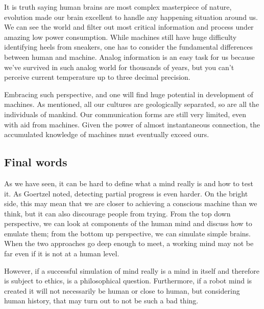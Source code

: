 \documentclass[11pt]{article}
\begin{document}
It is truth saying human brains are most complex masterpiece of nature, evolution made our brain excellent to handle any happening situation around us. We can see the world and filter out most critical information and process under amazing low power consumption. While machines still have huge difficulty identifying heels from sneakers, one has to consider the fundamental differences between human and machine. Analog information is an easy task for us because we've survived in such analog world for thousands of years, but you can't perceive current temperature up to three decimal precision.

Embracing such perspective, and one will find huge potential in development of machines. As mentioned, all our cultures are geologically separated, so are all the individuals of mankind. Our communication forms are still very limited, even with aid from machines. Given the power of almost instantaneous connection, the accumulated knowledge of machines must eventually exceed ours.

\subsection{Final words}
As we have seen, it can be hard to define what a mind really is and how to test it. 
As Goertzel noted, detecting partial progress is even harder. 
On the bright side, this may mean that we are closer to achieving a conscious machine than we think, but it can also discourage people from trying. 
From the top down perspective, we can look at components of the human mind and discuss how to emulate them; from the bottom up perspective, we can simulate simple brains. 
When the two approaches go deep enough to meet, a working mind may not be far even if it is not at a human level.

However, if a successful simulation of mind really is a mind in itself and therefore is subject to ethics, is a philosophical question. Furthermore, if a robot mind is created it will not necessarily be human or close to human, but considering human history, that may turn out to not be such a bad thing.




\end{document}
